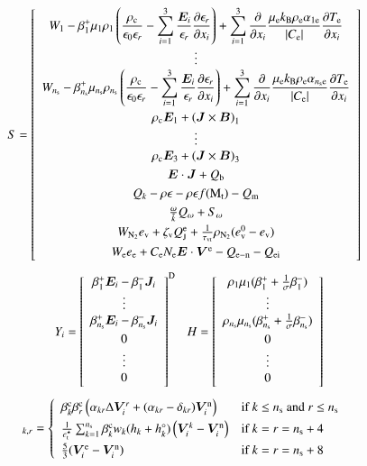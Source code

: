 \documentclass{warpdoc}
\newcommand{\alb}{\vspace{0.1cm}\\} %
\newcommand{\mfd}{\displaystyle}
\newcommand{\ns}{{n_{\rm s}}}
\renewcommand{\vec}[1]{\bm{#1}}
\begin{document}
%
%
\begin{equation}
S = \left[ \begin{array}{c}\mfd
W_1 
-\beta_1^+ \mu_1 \rho_1 \left(
  \frac{\rho_{\rm c}}{\epsilon_0\epsilon_r}
  -\sum_{i=1}^3 \frac{\vec{E}_i}{\epsilon_r} \frac{\partial \epsilon_r}{\partial x_i}  
\right)
+\sum_{i=1}^3 \frac{\partial}{\partial x_i} \frac{\mu_{\rm e} k_{\rm B}\rho_{\rm e} \alpha_{1{\rm e}}}{|C_{\rm e}|}\frac{\partial T_{\rm e}}{\partial x_i} \\
\vdots \\ \mfd
W_\ns 
-\beta_\ns^+ \mu_\ns \rho_\ns \left(
  \frac{\rho_{\rm c}}{\epsilon_0\epsilon_r}
  -\sum_{i=1}^3 \frac{\vec{E}_i}{\epsilon_r} \frac{\partial \epsilon_r}{\partial x_i}  
\right)
+\sum_{i=1}^3 \frac{\partial}{\partial x_i} \frac{\mu_{\rm e} k_{\rm B}\rho_{\rm e} \alpha_{\ns {\rm e}}}{|C_{\rm e}|}\frac{\partial T_{\rm e}}{\partial x_i}\alb
\rho_{\rm c} \vec{E}_1 + \left(\vec{J}\times\vec{B} \right)_1\\
\vdots\\
\rho_{\rm c} \vec{E}_3 + \left(\vec{J}\times\vec{B} \right)_3\alb
\vec{E}\cdot\vec{J}+Q_{\rm b}\alb
Q_k -\rho \epsilon -\rho\epsilon f({\rm M}_{\rm t})-Q_{\rm m} \alb
\frac{\omega}{\tilde{k}} Q_\omega + S_\omega  \alb
W_{\rm N_2} e_{\rm v} + \zeta_{\rm v} Q_{\rm J}^{\rm e} + \frac{1}{\tau_{\rm vt}} \rho_{\rm N_2}(e_{\rm v}^0 - e_{\rm v}) \alb
W_{\rm e} e_{\rm e} +   C_{\rm e} N_{\rm e} \vec{E} \cdot \vec{V}^{\rm e}  - Q_{\rm e-n} - Q_{\rm ei}\alb
\end{array}
\right]
\end{equation}
%
%
\begin{equation}
~~~
~~~
Y_i = \left[ \begin{array}{c}
\beta_1^+\vec{E}_i - \beta_1^- \vec{J}_i \\
\vdots \\
\beta_\ns^+\vec{E}_i - \beta_\ns^- \vec{J}_i \alb
0 \\
\vdots \\
0 \alb
\end{array}
\right]^{\rm D}
~~~
H = \left[ \begin{array}{c}
\rho_1 \mu_1( \beta^+_1   + \frac{1}{\sigma} \beta_1^-  ) \\
\vdots \\
\rho_\ns \mu_\ns( \beta^+_\ns   + \frac{1}{\sigma} \beta_\ns^-  ) \alb
0 \\
\vdots \\
0 \alb
\end{array}
\right]
~~~
\end{equation}
%
%
\begin{equation}
  [D_i]_{k,r}=\left\{\begin{array}{ll}
        \beta_k^{\rm c}\beta_r^{\rm c} \left(\alpha_{kr}\Delta \vec{V}_i^r+ (\alpha_{kr}-\delta_{kr})\vec{V}_i^{\rm n}\right) &\textrm{if $k\le \ns$ and $r \le \ns$} \alb
        \frac{1}{e_{\rm t}^\star} \sum_{k=1}^\ns \beta_k^{\rm c} w_k (h_k+h_k^\circ) \left(\vec{V}_i^{k}-\vec{V}_i^{\rm n}\right)  &\textrm{if $k=r=\ns+4$ } \alb
        \frac{5}{3}(\vec{V}_i^{\rm e}-\vec{V}_i^{\rm n}) &\textrm{if $k=r=\ns+8$}
             \end{array}  \right.
\end{equation}
%
\end{document}
